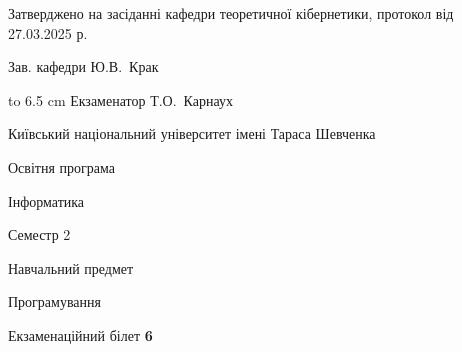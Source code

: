 \documentclass[12pt, ukrainian]{article}
\begin{document}
{\smallskip\smallskip \begin {scriptsize} Затверджено на засіданні кафедри теоретичної кібернетики, протокол   від   27.03.2025 р.\par\smallskip\smallskip\smallskip\smallskip
{\parbox {6.5 cm} {Зав. кафедри \dotfill Ю.В.~Крак}}\hspace {0.7cm} {\hbox to 6.5 cm { Екзаменатор \dotfill Т.О.~Карнаух}} \end{scriptsize}}
\newpage
{{\begin {scriptsize}\par
{ \center  Київський національний університет імені Тараса Шевченка \par}
{\parbox {5 cm}{Освітня програма \hfill}{\parbox {7 cm}{Інформатика\hfill}}\parbox {6 cm}{\hfill Семестр 2}}\par
{\parbox {5 cm} {Навчальний предмет \hfill}\parbox {7 cm}{Програмування \hfill}\parbox {6cm}{\hfill}\par}\vspace{-15pt} \end{scriptsize}}{\center Екзаменаційний білет \No \textbf { 6 }\par}}
\end{document}
